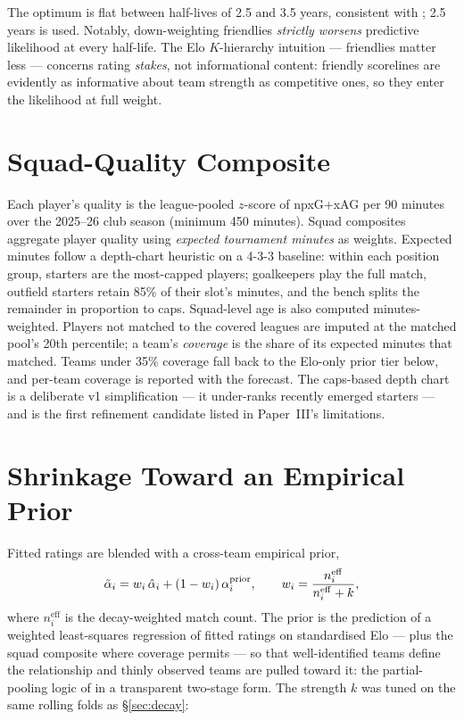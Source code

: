 \documentclass[11pt]{article}
\begin{document}
The optimum is flat between half-lives of 2.5 and 3.5 years, consistent with
\citet{leyetal2019}; 2.5 years is used. Notably, down-weighting friendlies
\emph{strictly worsens} predictive likelihood at every half-life. The Elo
$K$-hierarchy intuition --- friendlies matter less --- concerns rating
\emph{stakes}, not informational content: friendly scorelines are evidently as
informative about team strength as competitive ones, so they enter the
likelihood at full weight.

\section{Squad-Quality Composite}\label{sec:squad}
Each player's quality is the league-pooled $z$-score of npxG+xAG per 90
minutes over the 2025--26 club season (minimum 450 minutes). Squad composites
aggregate player quality using \emph{expected tournament minutes} as weights.
Expected minutes follow a depth-chart heuristic on a 4-3-3 baseline: within
each position group, starters are the most-capped players; goalkeepers play
the full match, outfield starters retain 85\% of their slot's minutes, and the
bench splits the remainder in proportion to caps. Squad-level age is also
computed minutes-weighted. Players not matched to the covered leagues are
imputed at the matched pool's 20th percentile; a team's \emph{coverage} is the
share of its expected minutes that matched. Teams under 35\% coverage fall
back to the Elo-only prior tier below, and per-team coverage is reported with
the forecast. The caps-based depth chart is a deliberate v1 simplification ---
it under-ranks recently emerged starters --- and is the first refinement
candidate listed in Paper~III's limitations.

\section{Shrinkage Toward an Empirical Prior}\label{sec:shrink}
Fitted ratings are blended with a cross-team empirical prior,
\begin{equation}
  \tilde{\alpha}_i = w_i\, \hat{\alpha}_i + (1 - w_i)\, \alpha_i^{\mathrm{prior}},
  \qquad
  w_i = \frac{n_i^{\mathrm{eff}}}{n_i^{\mathrm{eff}} + k},
\end{equation}
where $n_i^{\mathrm{eff}}$ is the decay-weighted match count. The prior is the
prediction of a weighted least-squares regression of fitted ratings on
standardised Elo --- plus the squad composite where coverage permits --- so that
well-identified teams define the relationship and thinly observed teams are
pulled toward it: the partial-pooling logic of \citet{baioblangiardo2010} in a
transparent two-stage form. The strength $k$ was tuned on the same rolling
folds as \S\ref{sec:decay}:
\end{document}
